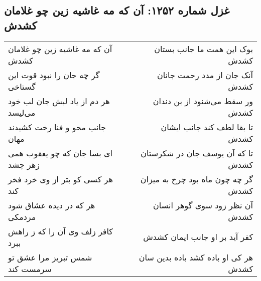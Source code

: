\begin{center}
\section*{غزل شماره ۱۲۵۲: آن که مه غاشیه زین چو غلامان کشدش}
\label{sec:1252}
\begin{longtable}{l p{0.5cm} r}
آن که مه غاشیه زین چو غلامان کشدش
&&
بوک این همت ما جانب بستان کشدش
\\
گر چه جان را نبود قوت این گستاخی
&&
آنک جان از مدد رحمت جانان کشدش
\\
هر دم از یاد لبش جان لب خود می‌لیسد
&&
ور سقط می‌شنود از بن دندان کشدش
\\
جانب محو و فنا رخت کشیدند مهان
&&
تا بقا لطف کند جانب ایشان کشدش
\\
ای بسا جان که چو یعقوب همی زهر چشد
&&
تا که آن یوسف جان در شکرستان کشدش
\\
هر کسی کو بتر از وی خرد فخر کند
&&
گر چه چون ماه بود چرخ به میزان کشدش
\\
هر که در دیده عشاق شود مردمکی
&&
آن نظر زود سوی گوهر انسان کشدش
\\
کافر زلف وی آن را که ز راهش ببرد
&&
کفر آید بر او جانب ایمان کشدش
\\
شمس تبریز مرا عشق تو سرمست کند
&&
هر کی او باده کشد باده بدین سان کشدش
\\
\end{longtable}
\end{center}
